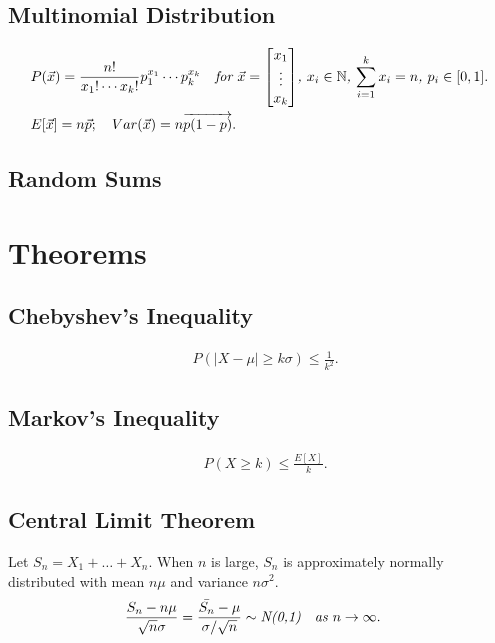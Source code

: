 \documentclass{article}
\begin{document}
\subsection{Multinomial Distribution}
\begin{align}
    & P(\vec{x}) = \frac{n!}{x_1!\cdots x_k!}p_1^{x_1}\cdots p_k^{x_k} \quad \emph{for $\vec{x} = \begin{bmatrix}
        x_1 \\ \vdots \\ x_k
    \end{bmatrix}$, $x_i\in \mathbb{N}$, $\sum_{i=1}^k x_i = n$, $p_i\in [0,1]$}. \nonumber \\
    & E[\vec{x}] = n\vec{p}; \quad Var(\vec{x}) = n\overrightarrow{p(1-p)}. \nonumber
\end{align}

\subsection{Random Sums}

\newpage
\section{Theorems}
\subsection{Chebyshev's Inequality}
\begin{align}
    & P(|X-\mu| \ge k\sigma) \le \frac{1}{k^2}. \nonumber
\end{align}

\subsection{Markov's Inequality}
\begin{align}
    & P(X \ge k) \le \frac{E[X]}{k}. \nonumber
\end{align}

\subsection{Central Limit Theorem}
Let $S_n = X_1 + \dots + X_n$. When $n$ is large, $S_n$ is approximately normally distributed with mean $n\mu $ and variance $n\sigma^2$.
\begin{align}
    & \frac{S_n-n\mu}{\sqrt{n}\sigma} = \frac{\bar{S_n} - \mu}{\sigma / \sqrt{n}} \sim \emph{N(0,1)} \quad \emph{as $n\to\infty$}. \nonumber
\end{align}
\end{document}
